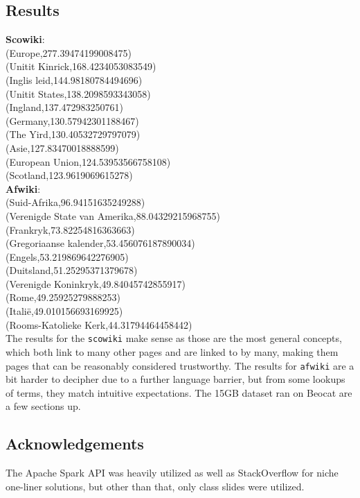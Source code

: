 \documentclass{article}
\begin{document}
\subsection{Results}
\textbf{Scowiki}: \\
(Europe,277.39474199008475) \\
(Unitit Kinrick,168.4234053083549) \\
(Inglis leid,144.98180784494696) \\
(Unitit States,138.2098593343058) \\
(Ingland,137.472983250761) \\
(Germany,130.57942301188467) \\
(The Yird,130.40532729797079) \\
(Asie,127.83470018888599) \\
(European Union,124.53953566758108) \\
(Scotland,123.9619069615278) \\

\noindent
\textbf{Afwiki}: \\
(Suid-Afrika,96.94151635249288) \\
(Verenigde State van Amerika,88.04329215968755) \\
(Frankryk,73.82254816363663) \\
(Gregoriaanse kalender,53.456076187890034) \\
(Engels,53.219869642276905) \\
(Duitsland,51.25295371379678) \\
(Verenigde Koninkryk,49.84045742855917) \\
(Rome,49.25925279888253) \\
(Italië,49.010156693169925) \\
(Rooms-Katolieke Kerk,44.31794464458442) \\

The results for the \texttt{scowiki} make sense as those are the most general concepts, which both link to many other pages and are linked to by many, making them pages that can be reasonably considered trustworthy. The results for \texttt{afwiki} are a bit harder to decipher due to a further language barrier, but from some lookups of terms, they match intuitive expectations. The 15GB dataset ran on Beocat are a few sections up.

\subsection{Acknowledgements}
The Apache Spark API was heavily utilized as well as StackOverflow for niche one-liner solutions, but other than that, only class slides were utilized.
\end{document}
